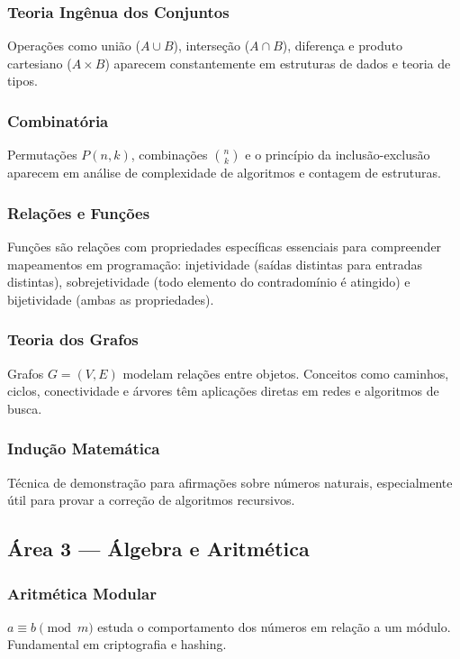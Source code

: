 \subsubsection*{Teoria Ingênua dos Conjuntos}
Operações como união ($A \cup B$), interseção ($A \cap B$), diferença e produto cartesiano
($A \times B$) aparecem constantemente em estruturas de dados e teoria de tipos.

\subsubsection*{Combinatória}
Permutações $P(n,k)$, combinações $\binom{n}{k}$ e o princípio da inclusão-exclusão
aparecem em análise de complexidade de algoritmos e contagem de estruturas.

\subsubsection*{Relações e Funções}
Funções são relações com propriedades específicas essenciais para compreender mapeamentos
em programação: injetividade (saídas distintas para entradas distintas), sobrejetividade
(todo elemento do contradomínio é atingido) e bijetividade (ambas as propriedades).

\subsubsection*{Teoria dos Grafos}
Grafos $G = (V, E)$ modelam relações entre objetos. Conceitos como caminhos, ciclos,
conectividade e árvores têm aplicações diretas em redes e algoritmos de busca.

\subsubsection*{Indução Matemática}
Técnica de demonstração para afirmações sobre números naturais, especialmente útil para
provar a correção de algoritmos recursivos.

\subsection*{Área 3 --- Álgebra e Aritmética}

\subsubsection*{Aritmética Modular}
$a \equiv b \pmod{m}$ estuda o comportamento dos números em relação a um módulo.
Fundamental em criptografia e hashing.

